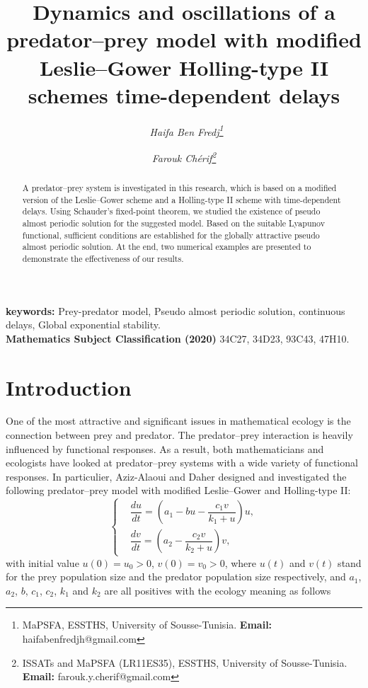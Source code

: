 \documentclass[[a4paper,10pt]{article}
\title{Dynamics and oscillations of a predator–prey model with modified Leslie–Gower
Holling-type II schemes time-dependent delays}
\author{ \textsl{\ Haifa Ben Fredj\footnote{MaPSFA, ESSTHS, University of Sousse-Tunisia.  
{\bf{Email:}} haifabenfredjh@gmail.com}} \hspace{1cm}
 \and
\textsl{ Farouk Chérif\footnote{ISSATs and MaPSFA (LR11ES35), ESSTHS, University of Sousse-Tunisia. 
{\bf{Email:}} farouk.y.cherif@gmail.com}} 
}
\begin{document}
\maketitle
\thispagestyle{empty}

\begin{abstract}
A predator–prey system is investigated in this research, which is based on a modified version of the Leslie–Gower scheme and a Holling-type II scheme with time-dependent delays. Using Schauder's fixed-point theorem,
we studied the existence  of pseudo almost periodic  solution for the suggested model.  Based on the   suitable
Lyapunov functional, sufficient conditions are established for the  globally attractive pseudo almost periodic solution. At the end, two numerical examples are presented to demonstrate the effectiveness of our results.
\end{abstract}
\textbf{keywords:} Prey-predator model, Pseudo almost periodic solution, continuous delays, Global exponential stability.\\
\textbf{Mathematics Subject Classification (2020)} 34C27, 34D23, 93C43, 47H10.

\section{Introduction}
One of the most attractive and significant issues in mathematical ecology is the connection between prey and predator. The predator–prey interaction is heavily influenced by functional responses. As a result, both mathematicians and ecologists have looked at predator–prey systems with a wide variety of functional responses.
In particulier, Aziz-Alaoui and Daher \cite{aziz2003boundedness} designed and investigated the following predator–prey model with modified Leslie–Gower and Holling-type II:
\begin{equation}\label{Aloui}
\left\{\begin{aligned}
&\dfrac{du}{dt}=\left(a_1-bu-\dfrac{c_1v}{k_1+u}\right)u,\\
&\dfrac{dv}{dt}=\left(a_2-\dfrac{c_2v}{k_2+u}\right)v,
\end{aligned}
\right.
\end{equation}
with initial value $u(0) = u_0 > 0$, $v(0) = v_0 > 0$, where $u(t)$ and $v(t)$ stand for the prey population size and the predator population size respectively, and $a_1$, $a_2$,  $b$, $c_1$, $c_2$, $k_1$ and $k_2$ are all positives with the ecology meaning as follows
\end{document}
